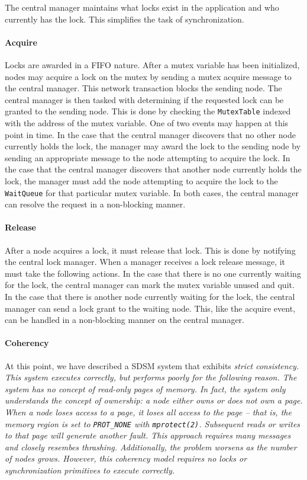 The central manager maintains what locks exist in the application and who currently has the lock.  This simplifies the task of synchronization.

\paragraph{Acquire}
Locks are awarded in a FIFO nature.  After a mutex variable has been initialized, nodes may acquire a lock on the mutex by sending a mutex acquire message to the central manager.  This network transaction blocks the sending node.  The central manager is then tasked with determining if the requested lock can be granted to the sending node.  This is done by checking the \verb,MutexTable, indexed with the address of the mutex variable.  One of two events may happen at this point in time.  In the case that the central manager discovers that no other node currently holds the lock, the manager may award the lock to the sending node by sending an appropriate message to the node attempting to acquire the lock.  In the case that the central manager discovers that another node currently holds the lock, the manager must add the node attempting to acquire the lock to the \verb,WaitQueue, for that particular mutex variable.  In both cases, the central manager can resolve the request in a non-blocking manner.

\paragraph{Release}
After a node acquires a lock, it must release that lock.  This is done by notifying the central lock manager.  When a manager receives a lock release message, it must take the following actions.  In the case that there is no one currently waiting for the lock, the central manager can mark the mutex variable unused and quit.  In the case that there is another node currently waiting for the lock, the central manager can send a lock grant to the waiting node.  This, like the acquire event, can be handled in a non-blocking manner on the central manager.

\paragraph{Coherency}
At this point, we have described a SDSM system that exhibits \em strict consistency\em.  This system executes correctly, but performs poorly for the following reason.  The system has no concept of read-only pages of memory.  In fact, the system only understands the concept of ownership: a node either owns or does not own a page.  When a node loses access to a page, it loses \em all \em access to the page -- that is, the memory region is set to \verb,PROT_NONE, with \verb,mprotect(2),.  Subsequent reads or writes to that page will generate another fault.  This approach requires many messages and closely resembes thrashing.  Additionally, the problem worsens as the number of nodes grows.  However, this coherency model requires no locks or synchronization primitives to execute correctly.

